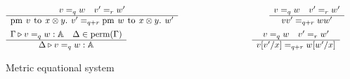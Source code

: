 \begin{figure} [H]
\begin{equation*}
\begin{split}
\begin{aligned}
&
\begin{minipage}[t]{0.3\textwidth}
$\begin{array}{c}
    v=_{q} w \quad  v'=_{r} w'  \\
    \hline
   \text{pm} \hspace{4pt} v \hspace{4pt} \text{to} \hspace{4pt} x \otimes y. \hspace{4pt} v'=_{q + r}\text{pm} \hspace{4pt} w \hspace{4pt} \text{to} \hspace{4pt} x \otimes y .  \hspace{4pt} w'
\end{array}
$
\end{minipage}
\hspace{200pt}
\begin{minipage}[t]{0.3\textwidth}
$\begin{array}{c}
    v =_{q} w \quad v'=_{r} w'   \\
    \hline
  v v' =_{q + r} w w'
\end{array}
$ \end{minipage}
 \\
 &
\begin{minipage}[t]{0.3\textwidth}
$\begin{array}{c}
  \Gamma \triangleright v =_{q} w: \mathbb{A} \quad \Delta \in \text{perm}(\Gamma)\\
    \hline
   \Delta \triangleright v =_{q} w: \mathbb{A}
\end{array}
$
\end{minipage}
\hspace{180pt}
\begin{minipage}[t]{0.3\textwidth}
$\begin{array}{c}
    v =_{q} w \quad v'=_{r} w'    \\
    \hline
  v[v'/x]=_{q + r} w[w'/x]
\end{array}
$ \end{minipage}
\hspace{10pt}
\end{aligned}
\end{split}
\end{equation*}
\caption{Metric equational system}
\label{fig:metric deductive system}
\end{figure}
\vspace{-5pt}



